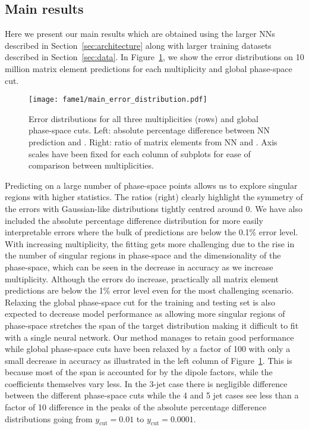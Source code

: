 \documentclass[main.tex]{subfiles}
\begin{document}
\subsection{Main results}\label{sec:mainresult}
Here we present our main results which are obtained using the larger NNs described in Section~\ref{sec:architecture} along with larger training datasets described in Section~\ref{sec:data}.
In Figure~\ref{fig:main_error_distribution}, we show the error distributions on 10 million matrix element predictions for each multiplicity and global phase-space cut.

\begin{figure}
    \centering
    \texttt{[image: fame1/main\_error\_distribution.pdf]}
    \caption{Error distributions for all three multiplicities (rows) and global phase-space cuts.
    Left: absolute percentage difference between NN prediction and {\NJet}.
    Right: ratio of matrix elements from NN and {\NJet}.
    Axis scales have been fixed for each column of subplots for ease of comparison between multiplicities.}
    \label{fig:main_error_distribution}
\end{figure}

Predicting on a large number of phase-space points allows us to explore singular regions with higher statistics. 
The ratios (right) clearly highlight the symmetry of the errors with Gaussian-like distributions tightly centred around 0.
We have also included the absolute percentage difference distribution for more easily interpretable errors where the bulk of predictions are below the 0.1\% error level.
With increasing multiplicity, the fitting gets more challenging due to the rise in the number of singular regions in phase-space and the dimensionality of the phase-space, which can be seen in the decrease in accuracy as we increase multiplicity.
Although the errors do increase, practically all matrix element predictions are below the 1\% error level even for the most challenging scenario.
Relaxing the global phase-space cut for the training and testing set is also expected to decrease model performance as allowing more singular regions of phase-space stretches the span of the target distribution making it difficult to fit with a single neural network.
Our method manages to retain good performance while global phase-space cuts have been relaxed by a factor of 100 with only a small decrease in accuracy as illustrated in the left column of Figure~\ref{fig:main_error_distribution}.
This is because most of the span is accounted for by the dipole factors, while the coefficients themselves vary less.
In the 3-jet case there is negligible difference between the different phase-space cuts while the 4 and 5 jet cases see less than a factor of 10 difference in the peaks of the absolute percentage difference distributions going from $y_{\mathrm{cut}} = 0.01$ to $y_{\mathrm{cut}} = 0.0001$.
\end{document}
